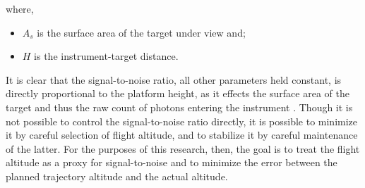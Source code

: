 \documentclass[10pt]{article}
\begin{document}
where, 

\begin{itemize}
\item $A_s$ is the surface area of the target under view and;
\item $H$ is the instrument-target distance.
\end{itemize}

It is clear that the signal-to-noise ratio, all other parameters held constant, is directly proportional to the platform height, as it effects the surface area of the target and thus the raw count of photons entering the instrument \cite{Gupta2018}. Though it is not possible to control the signal-to-noise ratio directly, it is possible to minimize it by careful selection of flight altitude, and to stabilize it by careful maintenance of the latter. For the purposes of this research, then, the goal is to treat the flight altitude as a proxy for signal-to-noise and to minimize the error between the planned trajectory altitude and the actual altitude.



\end{document}
